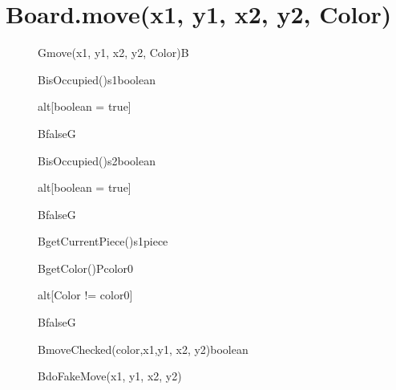\documentclass[6pt,landscape]{article}
\begin{document}
\section{Board.move(x1, y1, x2, y2, Color)}
\begin{figure}[H]
	\centering
  	\begin{adjustbox}{width=\textwidth, height=\textheight}
		\begin{sequencediagram}
			
			\begin{call}{G}{move(x1, y1, x2, y2, Color)}{B}{}	
				\begin{call}{B}{isOccupied()}{s1}{boolean}
				\end{call}
				\begin{sdblock}{alt}{[boolean = true]}
					\begin{messcall}{B}{false}{G}
					\end{messcall} 					  		
				\end{sdblock}
				
				\begin{call}{B}{isOccupied()}{s2}{boolean}
				\end{call}
				\begin{sdblock}{alt}{[boolean = true]}
					\begin{messcall}{B}{false}{G}
					\end{messcall} 					  		
				\end{sdblock}
				
				\begin{call}{B}{getCurrentPiece()}{s1}{piece}
				\end{call}
				
				\begin{call}{B}{getColor()}{P}{color0}
				\end{call}
					
					
				\begin{sdblock}{alt}{[Color != color0]}
					\begin{messcall}{B}{false}{G}
					\end{messcall} 					  		
				\end{sdblock}
				
				\begin{callself}{B}{moveChecked(color,x1,y1, x2, y2)}{boolean}
					\begin{callself}{B}{doFakeMove(x1, y1, x2, y2)}{}
					\end{callself}
					

\end{callself}
\end{call}
\end{sequencediagram}
\end{adjustbox}
\end{figure}
\end{document}
